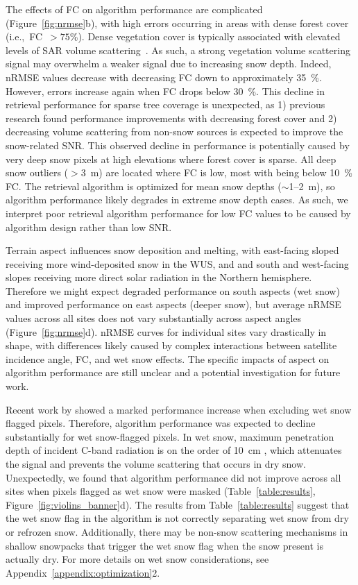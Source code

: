 \documentclass[journal abbreviation, manuscript]{copernicus}
\begin{document}
The effects of FC on algorithm performance are complicated (Figure~\ref{fig:nrmse}b), with high errors occurring in areas with dense forest cover (i.e.,~FC~$>75$\%). Dense vegetation cover is typically associated with elevated levels of SAR volume scattering~\citep{Vreugdenhil.2020}. As such, a strong vegetation volume scattering signal may overwhelm a weaker signal due to increasing snow depth. Indeed, nRMSE values decrease with decreasing FC down to approximately 35~\%. However, errors increase again when FC drops below 30~\%. This decline in retrieval performance for sparse tree coverage is unexpected, as 1) previous research found performance improvements with decreasing forest cover \citep{Lievens.2022} and 2) decreasing volume scattering from non-snow sources is expected to improve the snow-related SNR. This observed decline in performance is potentially caused by very deep snow pixels at high elevations where forest cover is sparse. All deep snow outliers ($>3$~m) are located where FC is low, most with being below 10~\% FC. The retrieval algorithm is optimized for mean snow depths ($\sim$1--2~m), so algorithm performance likely degrades in extreme snow depth cases. As such, we interpret poor retrieval algorithm performance for low FC values to be caused by algorithm design rather than low SNR.

Terrain aspect influences snow deposition and melting, with east-facing sloped receiving more wind-deposited snow in the WUS, and and south and west-facing slopes receiving more direct solar radiation in the Northern hemisphere. Therefore we might expect degraded performance on south aspects (wet snow) and improved performance on east aspects (deeper snow), but average nRMSE values across all sites does not vary substantially across aspect angles (Figure~{\ref{fig:nrmse}d}). nRMSE curves for individual sites vary drastically in shape, with differences likely caused by complex interactions between satellite incidence angle, FC, and wet snow effects. The specific impacts of aspect on algorithm performance are still unclear and a potential investigation for future work.

Recent work by \citet{Broxton.2024} showed a marked performance increase when excluding wet snow flagged pixels. Therefore, algorithm performance was expected to decline substantially for wet snow-flagged pixels. In wet snow, maximum penetration depth of incident C-band radiation is on the order of 10~cm \citep{Casey.2016}, which attenuates the signal and prevents the volume scattering that occurs in dry snow. Unexpectedly, we found that algorithm performance did not improve across all sites when pixels flagged as wet snow were masked (Table~\ref{table:results}, Figure~\ref{fig:violins_banner}d). The results from Table~\ref{table:results} suggest that the wet snow flag in the algorithm is not correctly separating wet snow from dry or refrozen snow. Additionally, there may be non-snow scattering mechanisms in shallow snowpacks that trigger the wet snow flag when the snow present is actually dry. For more details on wet snow considerations, see Appendix~\ref{appendix:optimization}2.  
\end{document}
